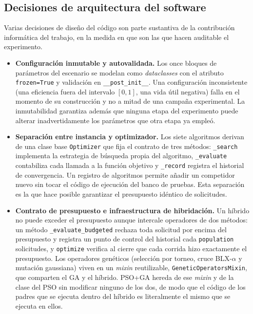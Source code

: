 \subsection{Decisiones de arquitectura del software}

Varias decisiones de diseño del código son parte sustantiva de la contribución informática del trabajo, en la medida en que son las que hacen auditable el experimento.

\begin{itemize}
    \item \textbf{Configuración inmutable y autovalidada.} Los once bloques de parámetros del escenario se modelan como \textit{dataclasses} con el atributo \texttt{frozen=True} y validación en \texttt{\_\_post\_init\_\_}. Una configuración inconsistente (una eficiencia fuera del intervalo $[0,1]$, una vida útil negativa) falla en el momento de su construcción y no a mitad de una campaña experimental. La inmutabilidad garantiza además que ninguna etapa del experimento puede alterar inadvertidamente los parámetros que otra etapa ya empleó.

    \item \textbf{Separación entre instancia y optimizador.} Los siete algoritmos derivan de una clase base \texttt{Optimizer} que fija el contrato de tres métodos: \texttt{\_search} implementa la estrategia de búsqueda propia del algoritmo, \texttt{\_evaluate} contabiliza cada llamada a la función objetivo y \texttt{\_record} registra el historial de convergencia. Un registro de algoritmos permite añadir un competidor nuevo sin tocar el código de ejecución del banco de pruebas. Esta separación es la que hace posible garantizar el presupuesto idéntico de solicitudes.

    \item \textbf{Contrato de presupuesto e infraestructura de hibridación.} Un híbrido no puede exceder el presupuesto aunque intercale operadores de dos métodos: un método \texttt{\_evaluate\_budgeted} rechaza toda solicitud por encima del presupuesto y registra un punto de control del historial cada \texttt{population} solicitudes, y \texttt{optimize} verifica al cierre que cada corrida hizo exactamente el presupuesto. Los operadores genéticos (selección por torneo, cruce BLX-$\alpha$ y mutación gaussiana) viven en un \textit{mixin} reutilizable, \texttt{GeneticOperatorsMixin}, que comparten el GA y el híbrido. PSO+GA hereda de ese \textit{mixin} y de la clase del PSO sin modificar ninguno de los dos, de modo que el código de los padres que se ejecuta dentro del híbrido es literalmente el mismo que se ejecuta en ellos.


\end{itemize}
